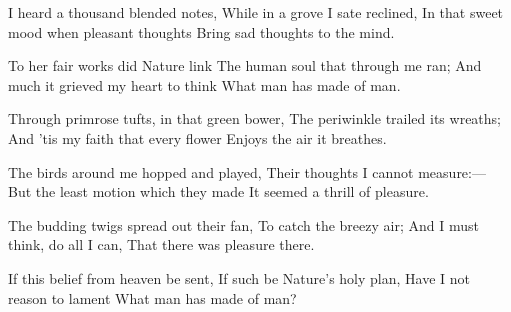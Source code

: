 \documentclass[fontsize=9, a5paper]{scrbook}
\newcommand\blankpage{%
    \null
    \thispagestyle{empty}%
    \addtocounter{page}{-1}%
    \newpage}
\begin{document}
\afterpage{\blankpage}
\begin{poem}

	\begin{stanza}
		I heard a thousand blended notes,\verseline
		While in a grove I sate reclined,\verseline
		In that sweet mood when pleasant thoughts\verseline
		Bring sad thoughts to the mind.
	\end{stanza}
	
	\begin{stanza}
		To her fair works did Nature link\verseline
		The human soul that through me ran;\verseline
		And much it grieved my heart to think\verseline
		What man has made of man.
	\end{stanza}
	
	\begin{stanza}
		Through primrose tufts, in that green bower,\verseline
		The periwinkle trailed its wreaths;\verseline
		And ’tis my faith that every flower\verseline
		Enjoys the air it breathes.
	\end{stanza}
	
	\begin{stanza}
		The birds around me hopped and played,\verseline
		Their thoughts I cannot measure:—\verseline
		But the least motion which they made\verseline
		It seemed a thrill of pleasure.
	\end{stanza}
	
	\begin{stanza}
		The budding twigs spread out their fan,\verseline
		To catch the breezy air;\verseline
		And I must think, do all I can,\verseline
		That there was pleasure there.
	\end{stanza}
	
	\begin{stanza}
		If this belief from heaven be sent,\verseline
		If such be Nature’s holy plan,\verseline
		Have I not reason to lament\verseline
		What man has made of man?
	\end{stanza}
\end{poem}

\pagebreak
\end{document}
